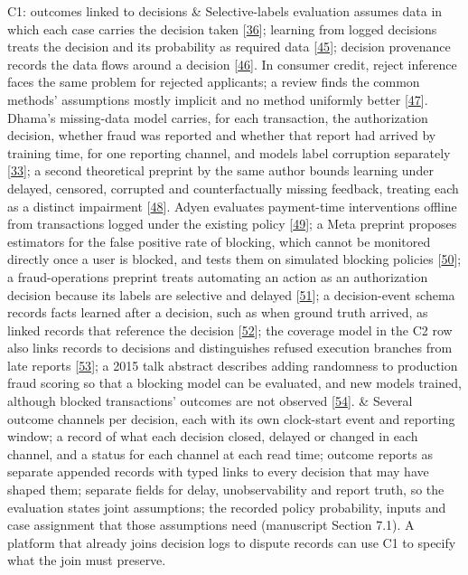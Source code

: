 \documentclass[
  11pt,
]{article}
\begin{document}
\begin{table}[!b]
{\begin{tabular}
C1: outcomes linked to decisions & Selective-labels evaluation assumes
data in which each case carries the decision taken
{[}\protect\hyperlink{ref-Lakkaraju2017Selective}{36}{]}; learning from
logged decisions treats the decision and its probability as required
data {[}\protect\hyperlink{ref-Bottou2013Counterfactual}{45}{]};
decision provenance records the data flows around a decision
{[}\protect\hyperlink{ref-Singh2019DecisionProvenance}{46}{]}. In
consumer credit, reject inference faces the same problem for rejected
applicants; a review finds the common methods' assumptions mostly
implicit and no method uniformly better
{[}\protect\hyperlink{ref-Ehrhardt2021RejectInference}{47}{]}. Dhama's
missing-data model carries, for each transaction, the authorization
decision, whether fraud was reported and whether that report had arrived
by training time, for one reporting channel, and models label corruption
separately {[}\protect\hyperlink{ref-Dhama2026Causal}{33}{]}; a second
theoretical preprint by the same author bounds learning under delayed,
censored, corrupted and counterfactually missing feedback, treating each
as a distinct impairment
{[}\protect\hyperlink{ref-Dhama2026Limits}{48}{]}. Adyen evaluates
payment-time interventions offline from transactions logged under the
existing policy {[}\protect\hyperlink{ref-Egg2025AdyenOPE}{49}{]}; a
Meta preprint proposes estimators for the false positive rate of
blocking, which cannot be monitored directly once a user is blocked, and
tests them on simulated blocking policies
{[}\protect\hyperlink{ref-Tocker2022VirtualControl}{50}{]}; a
fraud-operations preprint treats automating an action as an
authorization decision because its labels are selective and delayed
{[}\protect\hyperlink{ref-Deng2026FCAC}{51}{]}; a decision-event schema
records facts learned after a decision, such as when ground truth
arrived, as linked records that reference the decision
{[}\protect\hyperlink{ref-Solozobov2026DecisionTrace}{52}{]}; the
coverage model in the C2 row also links records to decisions and
distinguishes refused execution branches from late reports
{[}\protect\hyperlink{ref-Wu2026EvidenceCoverage}{53}{]}; a 2015 talk
abstract describes adding randomness to production fraud scoring so that
a blocking model can be evaluated, and new models trained, although
blocked transactions' outcomes are not observed
{[}\protect\hyperlink{ref-Manapat2015Counterfactual}{54}{]}. & Several
outcome channels per decision, each with its own clock-start event and
reporting window; a record of what each decision closed, delayed or
changed in each channel, and a status for each channel at each read
time; outcome reports as separate appended records with typed links to
every decision that may have shaped them; separate fields for delay,
unobservability and report truth, so the evaluation states joint
assumptions; the recorded policy probability, inputs and case assignment
that those assumptions need (manuscript Section 7.1). A platform that
already joins decision logs to dispute records can use C1 to specify
what the join must preserve. \\

\bottomrule\noalign{}
\end{tabular}
}
\end{table}
\end{document}
